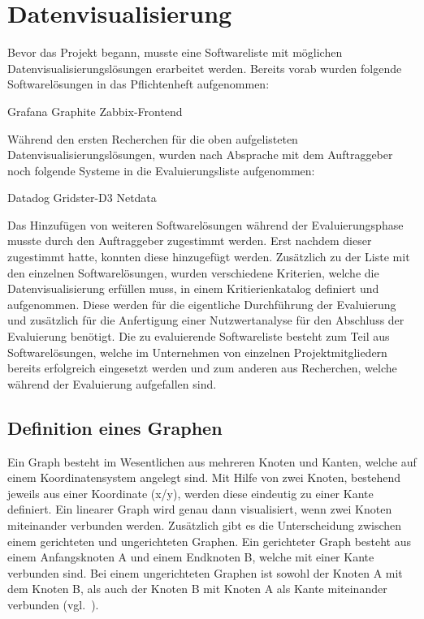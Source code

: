 {\section{Datenvisualisierung}
\label{sec:datenvisualisierung}
Bevor das Projekt begann, musste eine Softwareliste mit möglichen
Datenvisualisierungslösungen erarbeitet werden. Bereits vorab wurden folgende
Softwarelösungen in das Pflichtenheft aufgenommen:

\begin{outline}
  \1 Grafana
  \1 Graphite
  \1 Zabbix\hyp{}Frontend
\end{outline}

Während den ersten Recherchen für die oben aufgelisteten
Datenvisualisierungslösungen, wurden nach Absprache mit dem Auftraggeber noch
folgende Systeme in die Evaluierungsliste aufgenommen:

\begin{outline}
  \1 Datadog
  \1 Gridster\hyp{}D3
  \1 Netdata
\end{outline}

Das Hinzufügen von weiteren Softwarelösungen während der Evaluierungsphase
musste durch den Auftraggeber zugestimmt werden. Erst nachdem dieser zugestimmt
hatte, konnten diese hinzugefügt werden. Zusätzlich zu der Liste mit den
einzelnen Softwarelösungen, wurden verschiedene Kriterien, welche die
Datenvisualisierung erfüllen muss, in einem Kritierienkatalog definiert und
aufgenommen. Diese werden für die eigentliche Durchführung der Evaluierung und
zusätzlich für die Anfertigung einer Nutzwertanalyse für den Abschluss der
Evaluierung benötigt. Die zu evaluierende Softwareliste besteht zum Teil aus
Softwarelösungen, welche im Unternehmen von einzelnen Projektmitgliedern
bereits erfolgreich eingesetzt werden und zum anderen aus Recherchen, welche
während der Evaluierung aufgefallen sind.
\mr%

\subsection{Definition eines Graphen}
\label{subsec:definition_eines_graphen}
Ein Graph besteht im Wesentlichen aus mehreren Knoten und Kanten, welche auf
einem Koordinatensystem angelegt sind. Mit Hilfe von zwei Knoten, bestehend
jeweils aus einer Koordinate (x/y), werden diese eindeutig zu einer Kante
definiert. Ein linearer Graph wird genau dann visualisiert, wenn zwei Knoten
miteinander verbunden werden. Zusätzlich gibt es die Unterscheidung zwischen
einem gerichteten und ungerichteten Graphen. Ein gerichteter Graph besteht aus
einem Anfangsknoten A und einem Endknoten B, welche mit einer Kante verbunden
sind. Bei einem ungerichteten Graphen ist sowohl der Knoten A mit dem Knoten B,
als auch der Knoten B mit Knoten A als Kante miteinander
verbunden (vgl.~\cite{kaiser2008c}).

}

